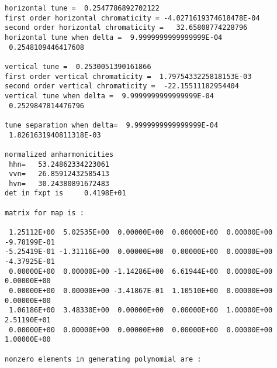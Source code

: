{\begin{verbatim}
horizontal tune =  0.2547786892702122
first order horizontal chromaticity = -4.0271619374618478E-04
second order horizontal chromaticity =   32.65808774228796
horizontal tune when delta =  9.9999999999999999E-04
 0.2548109446417608

vertical tune =  0.2530051390161866
first order vertical chromaticity =  1.7975433225818153E-03
second order vertical chromaticity =  -22.15511182954404
vertical tune when delta =  9.9999999999999999E-04
 0.2529847814476796

tune separation when delta=  9.9999999999999999E-04
 1.8261631940811318E-03

normalized anharmonicities
 hhn=   53.24862334223061
 vvn=   26.85912432585413
 hvn=   30.24380891672483
det in fxpt is     0.4198E+01

matrix for map is :

 1.25112E+00  5.02535E+00  0.00000E+00  0.00000E+00  0.00000E+00 -9.78199E-01
-5.25419E-01 -1.31116E+00  0.00000E+00  0.00000E+00  0.00000E+00 -4.37925E-01
 0.00000E+00  0.00000E+00 -1.14286E+00  6.61944E+00  0.00000E+00  0.00000E+00
 0.00000E+00  0.00000E+00 -3.41867E-01  1.10510E+00  0.00000E+00  0.00000E+00
 1.06186E+00  3.48330E+00  0.00000E+00  0.00000E+00  1.00000E+00  2.51190E+01
 0.00000E+00  0.00000E+00  0.00000E+00  0.00000E+00  0.00000E+00  1.00000E+00

nonzero elements in generating polynomial are :


\end{verbatim}}
